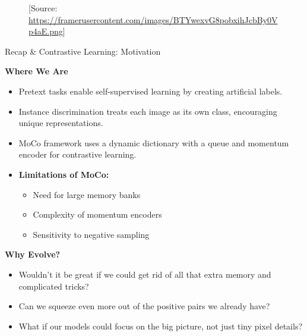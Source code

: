 \begin{frame}[allowframebreaks]{}
    \begin{figure}
        \centering
        {\footnotesize [Source: \url{https://framerusercontent.com/images/BTYwexvG8pobxihJcbBy0Vp4aE.png}]}
    \end{figure}
\end{frame}


\begin{frame}[allowframebreaks]{Recap \& Contrastive Learning: Motivation}

\textbf{Where We Are}
\begin{itemize}
    \item Pretext tasks enable self-supervised learning by creating artificial labels.
    \item Instance discrimination treats each image as its own class, encouraging unique representations.
    \item MoCo framework uses a dynamic dictionary with a queue and momentum encoder for contrastive learning.
    \item \textbf{Limitations of MoCo:}
    \begin{itemize}
        \item Need for large memory banks
        \item Complexity of momentum encoders
        \item Sensitivity to negative sampling
    \end{itemize}
    \end{itemize}

\framebreak

\textbf{Why Evolve?}
\begin{itemize}
    \item Wouldn't it be great if we could get rid of all that extra memory and complicated tricks?
    \item Can we squeeze even more out of the positive pairs we already have?
    \item What if our models could focus on the big picture, not just tiny pixel details?
\end{itemize}

\end{frame}